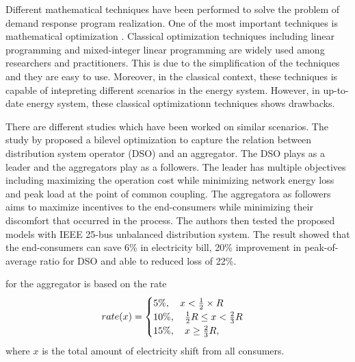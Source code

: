 \documentclass[a4paper]{article}
\begin{document}
Different mathematical techniques have been performed to solve the problem of demand response program realization.
One of the most important techniques is mathematical optimization \cite{sinha2018review, THIRUNAVUKKARASU2022100899}.
Classical optimization techniques including linear programming and mixed-integer linear programming are widely used among researchers and practitioners.
This is due to the simplification of the techniques and they are easy to use.
Moreover, in the classical context, these techniques is capable of intepreting different scenarios in the energy system.
However, in up-to-date energy system, these classical optimizationn techniques shows drawbacks.








\newpage

There are different studies which have been worked on similar scenarios. 
The study by \citet{TIWARI2025101671} proposed a bilevel optimization to capture the relation between distribution system operator (DSO) and an aggregator.
The DSO plays as a leader and the aggregators play as a followers.
The leader has multiple objectives including maximizing the operation cost while minimizing network energy loss and peak load at the point of common coupling.
The aggregatora as followers aims to maximize incentives to the end-consumers while minimizing their discomfort that occurred in the process. 
The authors then tested the proposed models with IEEE 25-bus unbalanced distribution system.
The result showed that the end-consumers can save 6\% in electricity bill, 20\% improvement in peak-of-average ratio for DSO and able to reduced loss of 22\%.














\newpage



\begin{optim}
\end{optim}


\newpage

\vspace{0.4cm}

 for the aggregator is based on the rate
\begin{equation}
  rate(x) = 
  \begin{cases}
    5\%, \quad x < \frac12 \times R \\
    10 \%, \quad \frac12 R \le x < \frac23 R \\
    15 \%, \quad x \ge \frac23 R,
  \end{cases}
\end{equation}
where $x$ is the total amount of electricity shift from all consumers.
\end{document}
